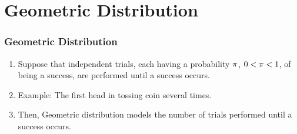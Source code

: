 \documentclass[compress]{beamer}
\newcommand{\sqBullet}[1]{  {\tiny \tiny \tiny \qBoxCol{#1!60}{ }} }
\begin{document}
%
%




\section{Geometric Distribution   }



\begin{frame}\frametitle{Geometric Distribution}
\vspace{-.1in}
\begin{enumerate}
\item Suppose that independent trials, each having a probability $\pi$,
$0 < \pi <1$, of being a success, are performed until a success occurs.
\item Example: The first head in tossing coin several times.
\item Then, Geometric distribution models the number of trials performed until a success occurs.
\end{enumerate}




\end{frame}
\end{document}
